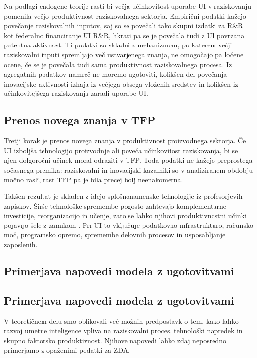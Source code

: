 \documentclass[12pt,a4paper]{article}
\begin{document}
Na podlagi endogene teorije rasti bi večja učinkovitost uporabe UI v raziskovanju pomenila večjo produktivnost raziskovalnega sektorja. Empirični podatki  kažejo povečanje raziskovalnih inputov, saj so se povečali tako skupni izdatki za R\&R kot federalno financiranje UI R\&R, hkrati pa se je povečala tudi z UI povrzana patentna aktivnost. Ti podatki so skladni z mehanizmom, po katerem večji raziskovalni inputi spremljajo več ustvarjenega znanja, ne omogočajo pa ločene ocene, če se je povečala tudi sama produktivnost raziskovalnega procesa. Iz agregatnih podatkov namreč ne moremo ugotoviti, kolikšen del povečanja inovacijske aktivnosti izhaja iz večjega obsega vloženih sredstev in kolikšen iz učinkovitejšega raziskovanja zaradi uporabe UI.

\subsection{Prenos novega znanja v TFP}

Tretji korak je prenos novega znanja v produktivnost proizvodnega sektorja. Če UI izboljša tehnologijo proizvodnje ali poveča učinkovitost raziskovanja, bi se njen dolgoročni učinek moral odraziti v TFP. Toda podatki ne kažejo preprostega sočasnega premika: raziskovalni in inovacijski kazalniki so v analiziranem obdobju močno rasli, rast TFP pa je bila precej bolj neenakomerna.

Takšen rezultat je skladen z idejo splošnonamenske tehnologije iz profesorjevih zapiskov. Širše tehnološke spremembe pogosto zahtevajo komplementarne investicije, reorganizacijo in učenje, zato se lahko njihovi produktivnostni učinki pojavijo šele z zamikom \parencite{polanec_rast}. Pri UI to vključuje podatkovno infrastrukturo, računsko moč, programsko opremo, spremembe delovnih procesov in usposabljanje zaposlenih.

\subsection{Primerjava napovedi modela z ugotovitvami}

\subsection{Primerjava napovedi modela z ugotovitvami}

V teoretičnem delu smo oblikovali več možnih predpostavk o tem, kako lahko razvoj umetne inteligence vpliva na raziskovalni proces, tehnološki napredek in skupno faktorsko produktivnost. Njihove napovedi lahko zdaj neposredno primerjamo z opaženimi podatki za ZDA.
\end{document}
